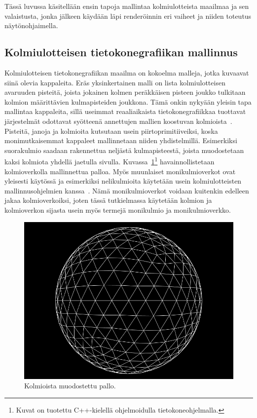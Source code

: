 \documentclass[finnish]{tktltiki2}
\theoremstyle{definition}
\theoremstyle{remark}
\begin{document}
Tässä luvussa käsitellään ensin tapoja mallintaa kolmiulotteista maailmaa ja sen valaistusta, jonka jälkeen käydään läpi renderöinnin eri vaiheet ja niiden toteutus näytönohjaimella.

\subsection{Kolmiulotteisen tietokonegrafiikan mallinnus}
Kolmiulotteisen tietokonegrafiikan maailma on kokoelma malleja, jotka kuvaavat siinä olevia kappaleita. Eräs yksinkertainen malli on lista kolmiulotteisen avaruuden pisteitä, joista jokainen kolmen peräkkäisen pisteen joukko tulkitaan kolmion määrittävien kulmapisteiden joukkona. Tämä onkin nykyään yleisin tapa mallintaa kappaleita, sillä useimmat reaaliaikaista tietokonegrafiikkaa tuottavat järjestelmät odottavat syötteenä annettujen mallien koostuvan kolmioista~\cite[s. 8]{Moller}. Pisteitä, janoja ja kolmioita kutsutaan usein piirtoprimitiiveiksi, koska monimutkaisemmat kappaleet mallinnetaan niiden yhdistelmillä. Esimerkiksi suorakulmio saadaan rakennettua neljästä kulmapisteestä, joista muodostetaan kaksi kolmiota yhdellä jaetulla sivulla. Kuvassa~\ref{fig:Monikulmioverkko}\footnote{Kuvat on tuotettu C++-kielellä ohjelmoidulla tietokoneohjelmalla.} havainnollistetaan kolmioverkolla mallinnettua palloa. Myös muunlaiset monikulmioverkot ovat yleisesti käytössä ja esimerkiksi nelikulmioita käytetään usein kolmiulotteisten mallinnusohjelmien kanssa~\cite[s. 636]{Hughes}. Nämä monikulmioverkot voidaan kuitenkin edelleen jakaa kolmioverkoiksi, joten tässä tutkielmassa käytetään kolmion ja kolmioverkon sijasta usein myös termejä monikulmio ja monikulmioverkko.

\begin{figure}[h]
\centering
\includegraphics[scale=0.6]{img/wireframe_crop.png}
\caption{Kolmioista muodostettu pallo.}
\label{fig:Monikulmioverkko}
\end{figure}
\end{document}
